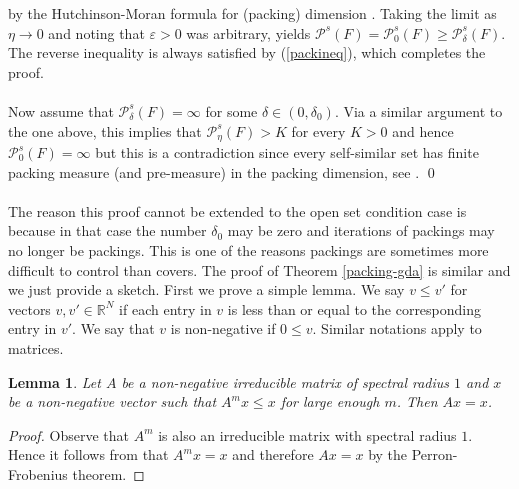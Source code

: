 \documentclass[11pt,english,british]{article}
\numberwithin{equation}{section}
\newtheorem{lma}[thm]{Lemma}
\renewcommand{\geq}{\geqslant}
\renewcommand{\leq}{\leqslant}
\begin{document}
by the Hutchinson-Moran formula for (packing) dimension \cite{hutchinson}.  Taking the limit as $\eta \to 0$ and noting that $\varepsilon>0$ was arbitrary, yields $\mathcal{P}^s(F)=\mathcal{P}^s_{0}(F)   \geq  \mathcal{P}^s_{\delta}(F)   $.  The reverse inequality is always satisfied by (\ref{packineq}), which completes the proof.
\\ \\
Now assume that $\mathcal{P}^s_{\delta}(F)=\infty$ for some $\delta \in (0, \delta_0)$. Via a similar argument to the one above, this implies that $\mathcal{P}^s_{\eta}(F)>K$ for every $K>0$ and hence $\mathcal{P}^s_{0}(F)=\infty$ but this is a contradiction since every self-similar set has finite packing measure (and pre-measure) in the packing dimension, see \cite[Exercise 3.2]{techniques}. \hfill \qed
\\ \\
The reason this proof cannot be extended to the open set condition case is because in that case the number $\delta_0$ may be zero and iterations of packings may no longer be packings.  This is one of the reasons packings are sometimes more difficult to control than covers.  The proof of Theorem \ref{packing-gda} is similar and we just provide a sketch.  First we prove a simple lemma. We say $v \leq v'$ for vectors $v,v' \in \mathbb{R}^N$ if each entry in $v$ is less than or equal to the corresponding entry in $v'$. We say that $v$ is non-negative if $0\leq v$. Similar notations apply to matrices.
\begin{lma}
\label{matrixlem}
Let $A$ be a non-negative irreducible matrix of spectral radius $1$ and $x$ be a non-negative vector such that $A^m x\leq x$ for large enough $m$. Then $Ax=x$.
\end{lma}
\begin{proof}
Observe that $A^m$ is also an irreducible matrix with spectral radius $1$. Hence it follows from \cite[Theorem 1.3.28]{matrix} that $A^m x = x$ and therefore $Ax=x$ by the Perron-Frobenius theorem.
\end{proof}
\end{document}
